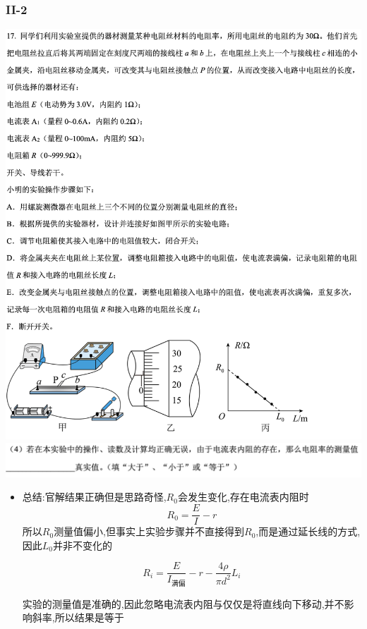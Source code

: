 \documentclass{article}
\begin{document}
    \subsubsection{II-2}
    \includegraphics[width=50em,keepaspectratio]{./pictures/1.2-9.png}  \\
    \includegraphics[width=50em,keepaspectratio]{./pictures/1.2-10.png}

    \begin{itemize}
        \item 总结:\quad 官解结果正确但是思路奇怪,$R_{0}$会发生变化,存在电流表内阻时
              $$
              R_{0} = \frac{E}{I} - r
              $$
              所以$R_{0}$测量值偏小,但事实上实验步骤并不直接得到$R_{0}$,而是通过延长线的方式,因此$L_{0}$并非不变化的

              $$
              R_{i} = \frac{E}{I_{满偏}} - r -\frac{4\rho}{\pi d^{2}} L_{i}
              $$

              实验的测量值是准确的,因此忽略电流表内阻与仅仅是将直线向下移动,并不影响斜率,所以结果是等于
    \end{itemize}
\end{document}
